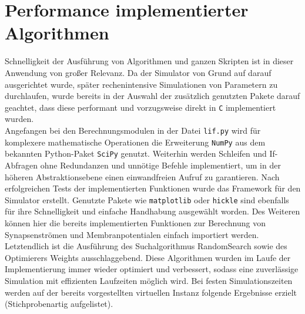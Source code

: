 \section{Performance implementierter Algorithmen}
\label{sec:erg_performance}
	Schnelligkeit der Ausführung von Algorithmen und ganzen Skripten ist in dieser Anwendung von großer Relevanz. Da der Simulator von Grund auf darauf ausgerichtet wurde, später rechenintensive Simulationen von Parametern zu durchlaufen, wurde bereits in der Auswahl der zusätzlich genutzten Pakete darauf geachtet, dass diese performant und vorzugsweise direkt in \texttt{C} implementiert wurden.\\
	Angefangen bei den Berechnungsmodulen in der Datei \texttt{lif.py} wird für komplexere mathematische Operationen die Erweiterung \texttt{NumPy} aus dem bekannten Python-Paket \texttt{SciPy} genutzt. Weiterhin werden Schleifen und If-Abfragen ohne Redundanzen und unnötige Befehle implementiert, um in der höheren Abstraktionsebene einen einwandfreien Aufruf zu garantieren. Nach erfolgreichen Tests der implementierten Funktionen wurde das Framework für den Simulator erstellt. Genutzte Pakete wie \texttt{matplotlib} oder \texttt{hickle} sind ebenfalls für ihre Schnelligkeit und einfache Handhabung ausgewählt worden. Des Weiteren können hier die bereits implementierten Funktionen zur Berechnung von Synapsenströmen und Membranpotentialen einfach importiert werden.\\
	Letztendlich ist die Ausführung des Suchalgorithmus RandomSearch sowie des Optimierers Weights ausschlaggebend. Diese Algorithmen wurden im Laufe der Implementierung immer wieder optimiert und verbessert, sodass eine zuverlässige Simulation mit effizienten Laufzeiten möglich wird. Bei festen Simulationszeiten werden auf der bereits vorgestellten virtuellen Instanz folgende Ergebnisse erzielt (Stichprobenartig aufgelistet).
	\begin{table}[htb]
		\centering
	\caption{Parametersuche durch Algorithmus \texttt{RandomSearch}.}
	\label{tab:sim_rs}
	\end{table}
